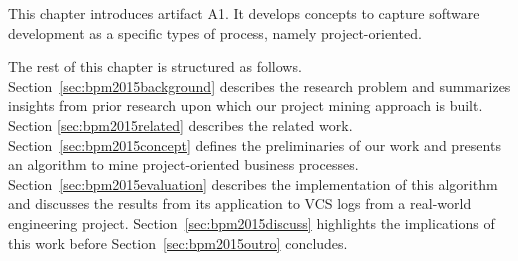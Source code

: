 This chapter introduces artifact A1. It develops concepts to capture software development as a specific types of process, namely project-oriented. 

The rest of this chapter is structured as follows. Section~\ref{sec:bpm2015background} describes the research problem and summarizes insights from prior research upon which our project mining approach is built. Section \cref{sec:bpm2015related} describes the related work. Section~\ref{sec:bpm2015concept} defines the preliminaries of our work and presents an algorithm to mine project-oriented business processes. Section~\ref{sec:bpm2015evaluation} describes the implementation of this algorithm and discusses the results from its application to VCS logs from a real-world engineering project. Section~\ref{sec:bpm2015discuss} highlights the implications of this work before Section~\ref{sec:bpm2015outro} concludes. 